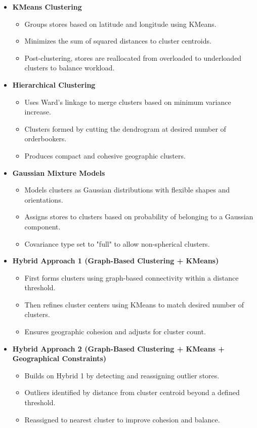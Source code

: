 \begin{itemize}
    \item \textbf{KMeans Clustering}
    \begin{itemize}
        \item Groups stores based on latitude and longitude using KMeans.
        \item Minimizes the sum of squared distances to cluster centroids.
        \item Post-clustering, stores are reallocated from overloaded to underloaded clusters to balance workload.
    \end{itemize}
    
    \item \textbf{Hierarchical Clustering}
    \begin{itemize}
        \item Uses Ward's linkage to merge clusters based on minimum variance increase.
        \item Clusters formed by cutting the dendrogram at desired number of orderbookers.
        \item Produces compact and cohesive geographic clusters.
    \end{itemize}
    
    \item \textbf{Gaussian Mixture Models}
    \begin{itemize}
        \item Models clusters as Gaussian distributions with flexible shapes and orientations.
        \item Assigns stores to clusters based on probability of belonging to a Gaussian component.
        \item Covariance type set to "full" to allow non-spherical clusters.
    \end{itemize}

    \item \textbf{Hybrid Approach 1 (Graph-Based Clustering + KMeans)}
    \begin{itemize}
        \item First forms clusters using graph-based connectivity within a distance threshold.%
        \item Then refines cluster centers using KMeans to match desired number of clusters.
        \item Ensures geographic cohesion and adjusts for cluster count.
    \end{itemize}

    \item \textbf{Hybrid Approach 2 (Graph-Based Clustering + KMeans + Geographical Constraints)}
    \begin{itemize}
        \item Builds on Hybrid 1 by detecting and reassigning outlier stores.
        \item Outliers identified by distance from cluster centroid beyond a defined threshold.
        \item Reassigned to nearest cluster to improve cohesion and balance.
    \end{itemize}
\end{itemize}

